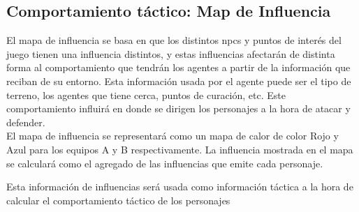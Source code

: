 \subsection{Comportamiento táctico: Map de Influencia}
El mapa de influencia se basa en que los distintos npcs y puntos de interés del juego tienen una influencia distintos, y estas influencias afectarán de distinta forma al comportamiento que tendrán los agentes a partir de la información que reciban de su entorno. Esta información usada por el agente puede ser el tipo de terreno, los agentes que tiene cerca, puntos de curación, etc. Este comportamiento influirá en donde se dirigen los personajes a la hora de atacar y defender. \\

El mapa de influencia se representará como un mapa de calor de color Rojo y Azul para los equipos A y B respectivamente. La influencia mostrada en el mapa se calculará como el agregado de las influencias que emite cada personaje.

Esta información de influencias será usada como información táctica a la hora de calcular el comportamiento táctico de los personajes